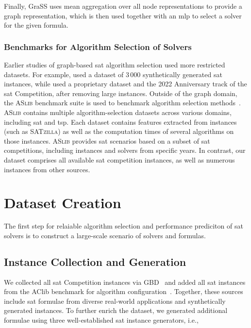Finally, GraSS uses mean aggregation over all node representations to provide a graph representation, which is then used together with an \gls{mlp} to select a solver for the given formula.



\subsubsection{Benchmarks for Algorithm Selection of  Solvers}

Earlier studies of graph-based \gls{sat} algorithm selection used more restricted datasets. For example, \citet{Shavit23} used a dataset of 3\,000 synthetically generated \gls{sat} instances, while \citet{ZhaEtAl24b} used a proprietary dataset and the 2022 Anniversary track of the \gls{sat} Competition, after removing large instances. Outside of the graph domain, the \textsc{ASlib} benchmark suite is used to benchmark algorithm selection methods~\citep{BisEtAl16b}. \textsc{ASlib} contains multiple algorithm-selection datasets across various domains, including \gls{sat} and \gls{tsp}. Each dataset contains features extracted from instances (such as \textsc{SATzilla}) as well as the computation times of several algorithms on those instances. \textsc{ASlib} provides \gls{sat} scenarios based on a subset of \gls{sat} competitions, including instances and solvers from specific years. In contrast, our dataset comprises all available \gls{sat} competition instances, as well as numerous instances from other sources.

\section{Dataset Creation}
\label{sec:ch07:benchmark}
The first step for relaiable algorithm selection and performance prediciton of \gls{sat} solvers is to construct a large-scale scenario of solvers and formulas.
\subsection{Instance Collection and Generation}
We collected all \gls{sat} Competition instances via GBD~\citep{IseJab24} and added all \gls{sat} instances from the AClib benchmark for algorithm configuration~\citep{HutEtAl14d}. Together, these sources include \gls{sat} formulae from diverse real-world applications and synthetically generated instances. To further enrich the dataset, we generated additional formulae using three well-established \gls{sat} instance generators, i.e.,

